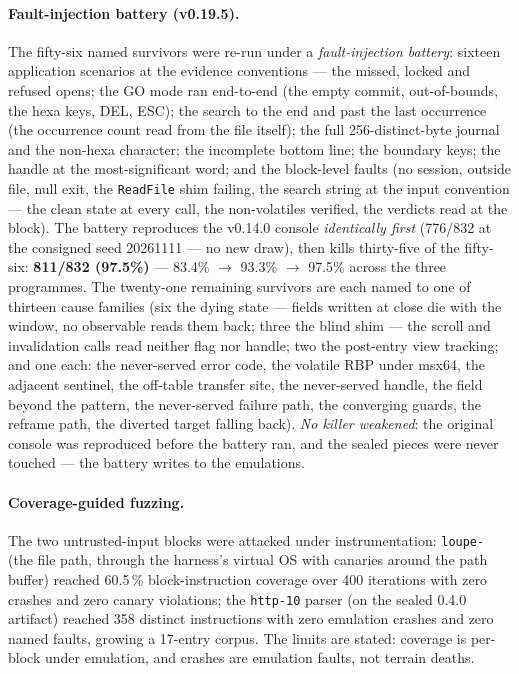 \documentclass[11pt,a4paper]{article}
\newcommand{\code}[1]{\texttt{\small #1}}
\begin{document}
\paragraph{Fault-injection battery (v0.19.5).} The fifty-six named
survivors were re-run under a \emph{fault-injection battery}: sixteen
application scenarios at the evidence conventions --- the missed,
locked and refused opens; the GO mode ran end-to-end (the empty
commit, out-of-bounds, the hexa keys, DEL, ESC); the search to the end
and past the last occurrence (the occurrence count read from the file
itself); the full 256-distinct-byte journal and the non-hexa
character; the incomplete bottom line; the boundary keys; the handle
at the most-significant word; and the block-level faults (no session,
outside file, null exit, the \code{ReadFile} shim failing, the search
string at the input convention --- the clean state at every call, the
non-volatiles verified, the verdicts read at the block). The battery
reproduces the v0.14.0 console \emph{identically first} (776/832 at
the consigned seed 20261111 --- no new draw), then kills thirty-five
of the fifty-six: \textbf{811/832 (97.5\%)} --- 83.4\% $\rightarrow$
93.3\% $\rightarrow$ 97.5\% across the three programmes. The
twenty-one remaining survivors are each named to one of thirteen cause
families (six the dying state --- fields written at close die with the
window, no observable reads them back; three the blind shim --- the
scroll and invalidation calls read neither flag nor handle; two the
post-entry view tracking; and one each: the never-served error code,
the volatile RBP under msx64, the adjacent sentinel, the off-table
transfer site, the never-served handle, the field beyond the pattern,
the never-served failure path, the converging guards, the reframe
path, the diverted target falling back). \emph{No killer weakened}:
the original console was reproduced before the battery ran, and the
sealed pieces were never touched --- the battery writes to the
emulations.

\paragraph{Coverage-guided fuzzing.} The two untrusted-input blocks were
attacked under instrumentation: \code{loupe-} (the file path, through
the harness's virtual OS with canaries around the path buffer) reached
60.5\,\% block-instruction coverage over 400 iterations with zero crashes
and zero canary violations; the \code{http-10} parser (on the sealed 0.4.0
artifact) reached 358 distinct instructions with zero emulation crashes
and zero named faults, growing a 17-entry corpus. The limits are stated:
coverage is per-block under emulation, and crashes are emulation faults,
not terrain deaths.
\end{document}
